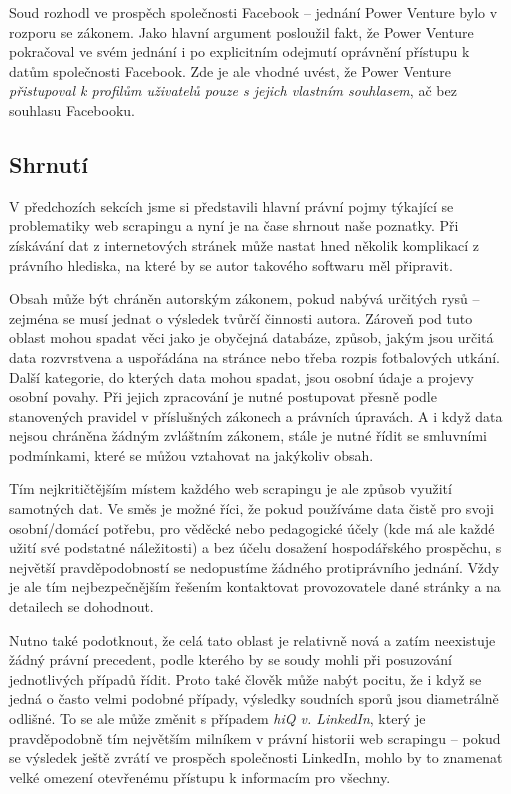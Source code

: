\documentclass[thesis=B,czech]{FITthesis}[2012/06/26]
\begin{document}
Soud rozhodl ve prospěch společnosti Facebook -- jednání Power Venture bylo v rozporu se zákonem. Jako hlavní argument posloužil fakt, že Power Venture pokračoval ve svém jednání i po explicitním odejmutí oprávnění přístupu k datům společnosti Facebook. Zde je ale vhodné uvést, že Power Venture \emph{přistupoval k profilům uživatelů pouze s jejich vlastním souhlasem}, ač bez souhlasu Facebooku.\cite{facebook_venture_2}

\subsection{Shrnutí}

V předchozích sekcích jsme si představili hlavní právní pojmy týkající se problematiky web scrapingu a nyní je na čase shrnout naše poznatky. Při získávání dat z internetových stránek může nastat hned několik komplikací z právního hlediska, na které by se autor takového softwaru měl připravit.

Obsah může být chráněn autorským zákonem, pokud nabývá určitých rysů -- zejména se musí jednat o výsledek tvůrčí činnosti autora. Zároveň pod tuto oblast mohou spadat věci jako je obyčejná databáze, způsob, jakým jsou určitá data rozvrstvena a uspořádána na stránce nebo třeba rozpis fotbalových utkání. Další kategorie, do kterých data mohou spadat, jsou osobní údaje a projevy osobní povahy. Při jejich zpracování je nutné postupovat přesně podle stanovených pravidel v příslušných zákonech a právních úpravách. A i když data nejsou chráněna žádným zvláštním zákonem, stále je nutné řídit se smluvními podmínkami, které se můžou vztahovat na jakýkoliv obsah.

Tím nejkritičtějším místem každého web scrapingu je ale způsob využití samotných dat. Ve směs je možné říci, že pokud používáme data čistě pro svoji osobní/domácí potřebu, pro věděcké nebo pedagogické účely (kde má ale každé užití své podstatné náležitosti) a bez účelu dosažení hospodářského prospěchu, s největší pravděpodobností se nedopustíme žádného protiprávního jednání. Vždy je ale tím nejbezpečnějším řešením kontaktovat provozovatele dané stránky a na detailech se dohodnout.

Nutno také podotknout, že celá tato oblast je relativně nová a zatím neexistuje žádný právní precedent, podle kterého by se soudy mohli při posuzování jednotlivých případů řídit. Proto také člověk může nabýt pocitu, že i když se jedná o často velmi podobné případy, výsledky soudních sporů jsou diametrálně odlišné. To se ale může změnit s případem \emph{hiQ v. LinkedIn}, který je pravděpodobně tím největším milníkem v právní historii web scrapingu -- pokud se výsledek ještě zvrátí ve prospěch společnosti LinkedIn, mohlo by to znamenat velké omezení otevřenému přístupu k informacím pro všechny.
\end{document}
